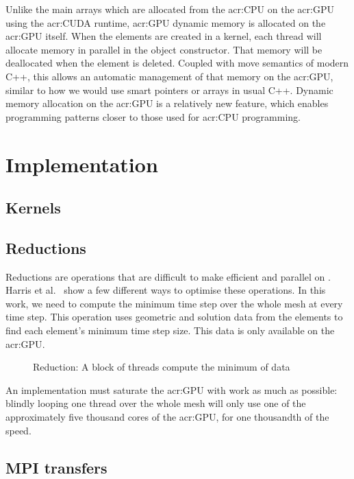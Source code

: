 Unlike the main arrays which are allocated from the \acrshort{acr:CPU} on the \acrshort{acr:GPU}
using the \acrshort{acr:CUDA} runtime, \acrshort{acr:GPU} dynamic memory is allocated on the
\acrshort{acr:GPU} itself. When the elements are created in a kernel, each thread will allocate
memory in parallel in the object constructor. That memory will be deallocated when the element is
deleted. Coupled with move semantics of modern C++, this allows an automatic management of that
memory on the \acrshort{acr:GPU}, similar to how we would use smart pointers or arrays in usual C++.
Dynamic memory allocation on the \acrshort{acr:GPU} is a relatively new feature, which enables
programming patterns closer to those used for \acrshort{acr:CPU} programming.

\section{Implementation}\label{section:graphics_processing_units:implementation}

\subsection{Kernels}\label{subsection:graphics_processing_units:implementation:kernels}

\subsection{Reductions}\label{subsection:graphics_processing_units:implementation:reductions}

Reductions are operations that are difficult to make efficient and parallel on .
Harris et al.~\cite{Harris2007} show a few different ways to optimise these operations. In this
work, we need to compute the minimum time step over the whole mesh at every time step. This
operation uses geometric and solution data from the elements to find each element's minimum time
step size. This data is only available on the \acrshort{acr:GPU}. 

\begin{figure}[H]
	\centering
	
	\caption{Reduction: A block of threads compute the minimum of data}\label{fig:reduction}
\end{figure}

An implementation must saturate the \acrshort{acr:GPU} with work as much as possible: blindly
looping one thread over the whole mesh will only use one of the approximately five thousand cores of
the \acrshort{acr:GPU}, for one thousandth of the speed. 

\subsection{MPI transfers}\label{subsection:graphics_processing_units:implementation:mpi_transfers}
